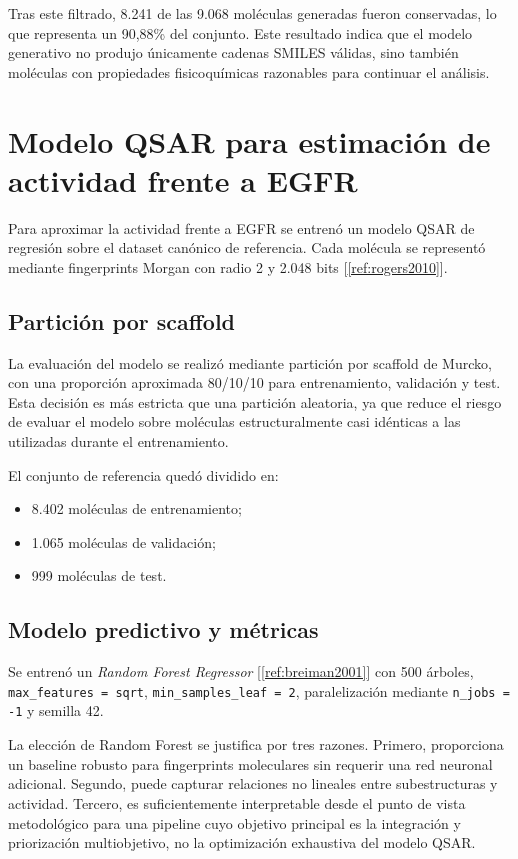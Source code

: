 \documentclass[IB]{TFUOC}%
\begin{document}
Tras este filtrado, 8.241 de las 9.068 moléculas generadas fueron conservadas, lo que representa un 90,88\% del conjunto. Este resultado indica que el modelo generativo no produjo únicamente cadenas SMILES válidas, sino también moléculas con propiedades fisicoquímicas razonables para continuar el análisis.

\section{Modelo QSAR para estimación de actividad frente a EGFR}

Para aproximar la actividad frente a EGFR se entrenó un modelo QSAR de regresión sobre el dataset canónico de referencia. Cada molécula se representó mediante fingerprints Morgan con radio 2 y 2.048 bits [\ref{ref:rogers2010}].

\subsection{Partición por scaffold}

La evaluación del modelo se realizó mediante partición por scaffold de Murcko, con una proporción aproximada 80/10/10 para entrenamiento, validación y test. Esta decisión es más estricta que una partición aleatoria, ya que reduce el riesgo de evaluar el modelo sobre moléculas estructuralmente casi idénticas a las utilizadas durante el entrenamiento.

El conjunto de referencia quedó dividido en:

\begin{itemize}
    \item 8.402 moléculas de entrenamiento;
    \item 1.065 moléculas de validación;
    \item 999 moléculas de test.
\end{itemize}

\subsection{Modelo predictivo y métricas}

Se entrenó un \textit{Random Forest Regressor} [\ref{ref:breiman2001}] con 500 árboles, \texttt{max\_features = sqrt}, \texttt{min\_samples\_leaf = 2}, paralelización mediante \texttt{n\_jobs = -1} y semilla 42.

La elección de Random Forest se justifica por tres razones. Primero, proporciona un baseline robusto para fingerprints moleculares sin requerir una red neuronal adicional. Segundo, puede capturar relaciones no lineales entre subestructuras y actividad. Tercero, es suficientemente interpretable desde el punto de vista metodológico para una pipeline cuyo objetivo principal es la integración y priorización multiobjetivo, no la optimización exhaustiva del modelo QSAR.
\end{document}

